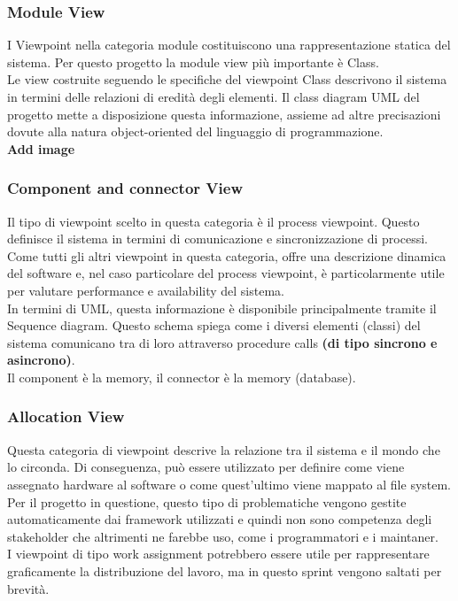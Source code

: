 \documentclass{article}
\begin{document}
\subsubsection{Module View}
I Viewpoint nella categoria module costituiscono una rappresentazione statica del sistema. Per questo progetto la module view più importante è Class. 
\\Le view costruite seguendo le specifiche del viewpoint Class descrivono il sistema in termini delle relazioni di eredità degli elementi. Il class diagram UML del progetto mette a disposizione questa informazione, assieme ad altre precisazioni dovute alla natura object-oriented del linguaggio di programmazione. 
\\\textbf{Add image}
\subsubsection{Component and connector View}
Il tipo di viewpoint scelto in questa categoria è il process viewpoint. Questo definisce il sistema in termini di comunicazione e sincronizzazione di processi. 
\\Come tutti gli altri viewpoint in questa categoria, offre una descrizione dinamica del software e, nel caso particolare del process viewpoint, è particolarmente utile per valutare performance e availability del sistema. 
\\In termini di UML, questa informazione è disponibile principalmente tramite il Sequence diagram. Questo schema spiega come i diversi elementi (classi) del sistema comunicano tra di loro attraverso procedure calls \textbf{(di tipo sincrono e asincrono)}.
\\Il component è la memory, il connector è la memory (database).
\subsubsection{Allocation View}
Questa categoria di viewpoint descrive la relazione tra il sistema e il mondo che lo circonda. Di conseguenza, può essere utilizzato per definire come viene assegnato hardware al software o come quest’ultimo viene mappato al file system. 
\\Per il progetto in questione, questo tipo di problematiche vengono gestite automaticamente dai framework utilizzati e quindi non sono competenza degli stakeholder che altrimenti ne farebbe uso, come i programmatori e i maintaner.
\\I viewpoint di tipo work assignment potrebbero essere utile per rappresentare graficamente la distribuzione del lavoro, ma in questo sprint vengono saltati per brevità. 
\newpage
\end{document}
